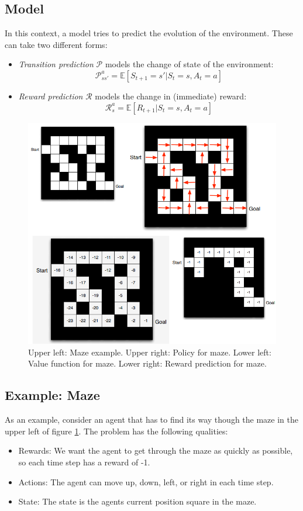 \documentclass[12pt, a4paper]{article}
\numberwithin{equation}{section}
\begin{document}
\subsection{Model}
In this context, a model tries to predict the evolution of the environment. These can take two different forms:
\begin{itemize}
\item \textit{Transition prediction} $\mathcal{P}$ models the change of state of the environment:
\begin{equation}
\mathcal{P}^a_{ss'}=\mathbb{E}[S_{t+1}=s'|S_t=s, A_t=a]
\end{equation}
\item \textit{Reward prediction} $\mathcal{R}$ models the change in (immediate) reward:
\begin{equation}
\mathcal{R}^a_s=\mathbb{E}[R_{t+1}|S_t=s, A_t=a]
\end{equation}
\end{itemize}

\begin{figure}
\centering
\includegraphics[width=\textwidth]{maze}
\caption{Upper left: Maze example. Upper right: Policy for maze. Lower left: Value function for maze. Lower right: Reward prediction for maze.}
\label{fig:maze}
\end{figure}

\subsection{Example: Maze}
As an example, consider an agent that has to find its way though the maze in the upper left of figure \ref{fig:maze}.  The problem has the following qualities:
\begin{itemize}
\item Rewards: We want the agent to get through the maze as quickly as possible, so each time step has a reward of -1.
\item Actions: The agent can move up, down, left, or right in each time step.
\item State: The state is the agents current position square in the maze.
\end{itemize}
\end{document}
